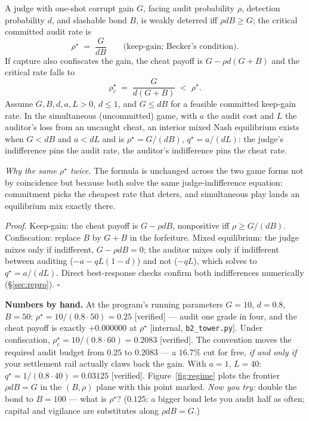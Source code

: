 \documentclass[11pt,a4paper]{article}
\begin{document}
\begin{thebox}
\begin{theorem}\label{thm:stage}
A judge with one-shot corrupt gain $G$, facing audit probability $\rho$, detection probability $d$, and slashable bond $B$, is weakly deterred iff $\rho d B \ge G$; the critical committed audit rate is
\[ \rho^\star \;=\; \frac{G}{dB} \qquad \text{(keep-gain; Becker's condition).} \]
If capture also confiscates the gain, the cheat payoff is $G - \rho d (G{+}B)$ and the critical rate falls to
\[ \rho^\star_c \;=\; \frac{G}{d(G+B)} \;<\; \rho^\star. \]
Assume $G,B,d,a,L>0$, $d\le1$, and $G\le dB$ for a feasible committed keep-gain rate. In the simultaneous (uncommitted) game, with $a$ the audit cost and $L$ the auditor's loss from an uncaught cheat, an interior mixed Nash equilibrium exists when $G<dB$ and $a<dL$ and is $\rho^\star = G/(dB)$, $q^\star = a/(dL)$: the judge's indifference pins the audit rate, the auditor's indifference pins the cheat rate.
\end{theorem}
\end{thebox}

\emph{Why the same $\rho^\star$ twice.} The formula is unchanged across the two game forms not by coincidence but because both solve the same judge-indifference equation: commitment picks the cheapest rate that deters, and simultaneous play lands an equilibrium mix exactly there.

\emph{Proof.} Keep-gain: the cheat payoff is $G - \rho d B$, nonpositive iff $\rho \ge G/(dB)$. Confiscation: replace $B$ by $G+B$ in the forfeiture. Mixed equilibrium: the judge mixes only if indifferent, $G - \rho d B = 0$; the auditor mixes only if indifferent between auditing ($-a - qL(1-d)$) and not ($-qL$), which solves to $q^\star = a/(dL)$. Direct best-response checks confirm both indifferences numerically (\S\ref{sec:repro}). \hfill$\square$

\textbf{Numbers by hand.} At the program's running parameters $G{=}10$, $d{=}0.8$, $B{=}50$: $\rho^\star = 10/(0.8\cdot 50) = 0.25$ [verified] --- audit one grade in four, and the cheat payoff is exactly $+0.000000$ at $\rho^\star$ [internal, \texttt{b2\_\allowbreak tower.py}]. Under confiscation, $\rho^\star_c = 10/(0.8\cdot 60) = 0.2083$ [verified]. The convention moves the required audit budget from $0.25$ to $0.2083$ --- a $16.7\%$ cut for free, \emph{if and only if} your settlement rail actually claws back the gain. With $a{=}1$, $L{=}40$: $q^\star = 1/(0.8\cdot 40) = 0.03125$ [verified]. Figure~\ref{fig:regime} plots the frontier $\rho d B = G$ in the $(B,\rho)$ plane with this point marked. \emph{Now you try:} double the bond to $B{=}100$ --- what is $\rho^\star$? ($0.125$: a bigger bond lets you audit half as often; capital and vigilance are substitutes along $\rho d B = G$.)
\end{document}
